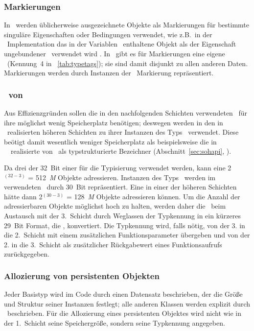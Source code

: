 \subsubsection{Markierungen}
%
In \cl\ werden \"{u}blicherweise ausgezeichnete Objekte als Markierungen
f\"{u}r bestimmte singul\"{a}re Eigenschaften oder Bedingungen verwendet,
wie z.B.\ in der \closette\ Implementation das in der Variablen
\ enthaltene Objekt
als \representation{} der Eigenschaft \rglq{}ungebundener \Slt\/\rgrq\
verwendet wird .  In \plob\ gibt es f\"{u}r Markierungen eine
eigene \rglq\cls\rgrq\ (Kennung~4 in \tablename~\ref{tab:typetags});
sie sind damit disjunkt zu allen anderen Daten. Markierungen werden
durch Instanzen der \rglq\cls\rgrq\ Markierung repr\"{a}sentiert.
%
\subsubsection{\protect\representation\ von \protect\objid[s]}
%
Aus Effizienzgr\"{u}nden sollen die in den nachfolgenden Schichten
verwendeten \objid[s]\ f\"{u}r ihre \representation{} m\"{o}glichst wenig
Speicherplatz ben\"{o}tigen; deswegen werden in den in \cl\ realisierten
h\"{o}heren Schichten zu ihrer \representation{} Instanzen des Typs
\class{fixnum}\ verwendet. Diese \representation{} be\"{o}tigt damit
wesentlich weniger Speicherplatz als beispielsweise die in
\soh\ \ifbericht\cite[]{bib:ki94a}\fi\ realisierte
\representation{} von \objid[s]\ als typstrukturierte Bezeichner
\ifbericht%
\cite[]{bib:ki94a}%
\else%
(Abschnitt~\ref{sec:sohapi}, \citepage{\pageref{sec:sohapi}})\fi.
%
\par{}Da drei der 32~Bit einer \lobjid\/ f\"{u}r die
Typisierung verwendet werden, kann eine \lobjid\/ 2$^{(32-3)}$ =
512~{\it M} Objekte adressieren. Instanzen des Typs
\ werden im 
verwendeten \lwcl\ durch 30~Bit repr\"{a}sentiert. Eine \lobjid\/ in einer
der h\"{o}heren Schichten h\"{a}tte dann 2$^{(30-3)}$ = 128~{\it M} Objekte
adressieren k\"{o}n\-nen. Um die Anzahl der adressierbaren Objekte
m\"{o}glichst hoch zu halten, werden daher die \lobjid[s]\ beim Austausch
mit der 3.~Schicht durch Weglassen der Typkennung in ein k\"{u}rzeres
29~Bit Format, die \sobjid[s], konvertiert. Die Typkennung
wird, falls n\"{o}tig, von der 3. in die 2.~Schicht mit
einem zu\-s\"{a}tz\-li\-chen Funktionsparameter \"{u}bergeben und von der
2. in die 3.~Schicht als zus\"{a}tzlicher R\"{u}ckgabewert eines
Funktionsaufrufs zur\"{u}ckgegeben.
%
\subsubsection{Allozierung von persistenten Objekten}
%
Jeder Basistyp wird im Code durch einen Datensatz beschrieben, der
die Gr\"{o}\ss{}e und Struktur seiner Instanzen festlegt; alle anderen
Klassen werden explizit durch \clsdo[e]\ beschrieben.
F\"{u}r die Allozierung eines persistenten Objektes wird nicht wie
in der 1.~Schicht seine Speichergr\"{o}\ss{}e, sondern seine Typkennung
angegeben.
%
